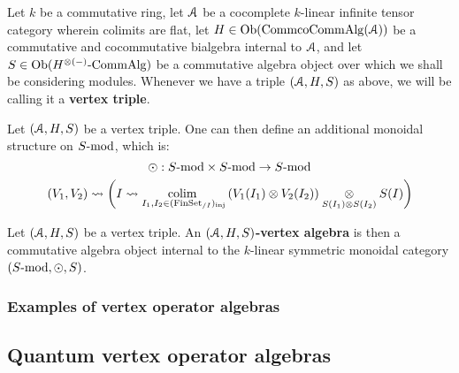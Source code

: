             \begin{convention} \label{conv: vertex_triples}
                Let $k$ be a commutative ring, let $\calA$ be a cocomplete $k$-linear infinite tensor category wherein colimits are flat, let $H \in \Ob(\Comm\co\Comm\Alg(\calA))$ be a commutative and cocommutative bialgebra internal to $\calA$, and let $S \in \Ob(H^{\tensor (-)}\-\Comm\Alg)$ be a commutative algebra object over which we shall be considering modules. Whenever we have a triple $(\calA, H, S)$ as above, we will be calling it a \textbf{vertex triple}.
            \end{convention}
            \begin{definition} \label{def: singular_tensor_products}
                Let $(\calA, H, S)$ be a vertex triple. One can then define an additional monoidal structure on $S\mod$, which is:
                    $$\singtensor: S\mod \x S\mod \to S\mod$$
                    $$(V_1, V_2) \mapsto \left( I \mapsto \underset{I_1, I_2 \in (\Fin\Sets_{/I})_{\inj}}{\colim} \left(V_1(I_1) \tensor V_2(I_2)\right) \tensor_{S(I_1) \tensor S(I_2)} S(I) \right)$$
            \end{definition}
            \begin{remark}
                
            \end{remark}
            \begin{definition} \label{def: (A, H, S)_vertex_algebras}
                Let $(\calA, H, S)$ be a vertex triple. An \textbf{$(\calA, H, S)$-vertex algebra} is then a commutative algebra object internal to the $k$-linear symmetric monoidal category $(S\mod, \singtensor, S)$.
            \end{definition}
        
        \subsubsection{Examples of vertex operator algebras}
    
    \subsection{Quantum vertex operator algebras}